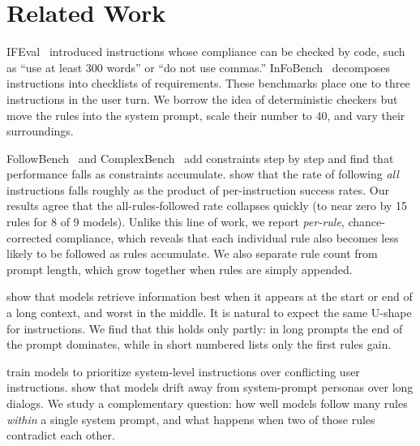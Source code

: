 \section{Related Work}
\label{sec:related}

IFEval~\cite{zhou2023ifeval} introduced instructions whose compliance can be checked by code, such as ``use at least 300 words'' or ``do not use commas.''
InFoBench~\cite{qin2024infobench} decomposes instructions into checklists of requirements.
These benchmarks place one to three instructions in the user turn.
We borrow the idea of deterministic checkers but move the rules into the system prompt, scale their number to 40, and vary their surroundings.

FollowBench~\cite{jiang2024followbench} and ComplexBench~\cite{wen2024complexbench} add constraints step by step and find that performance falls as constraints accumulate.
\citet{harada2024curse} show that the rate of following {\em all} instructions falls roughly as the product of per-instruction success rates.
Our results agree that the all-rules-followed rate collapses quickly (to near zero by 15 rules for 8 of 9 models).
Unlike this line of work, we report {\em per-rule}, chance-corrected compliance, which reveals that each individual rule also becomes less likely to be followed as rules accumulate.
We also separate rule count from prompt length, which grow together when rules are simply appended.

\citet{liu2024lost} show that models retrieve information best when it appears at the start or end of a long context, and worst in the middle.
It is natural to expect the same U-shape for instructions.
We find that this holds only partly: in long prompts the end of the prompt dominates, while in short numbered lists only the first rules gain.

\citet{wallace2024hierarchy} train models to prioritize system-level instructions over conflicting user instructions.
\citet{li2024instability} show that models drift away from system-prompt personas over long dialogs.
We study a complementary question: how well models follow many rules {\em within} a single system prompt, and what happens when two of those rules contradict each other.
